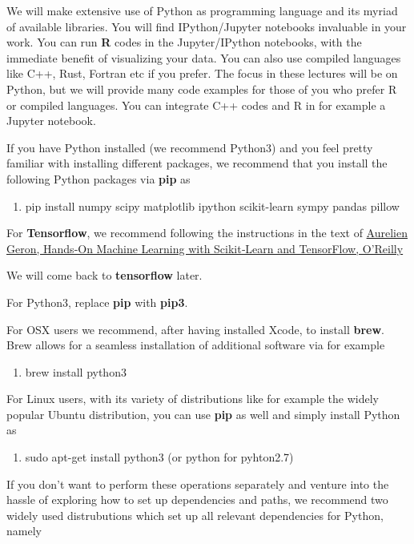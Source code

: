 \documentclass[%
oneside,                 %
final,                   %
10pt]{article}
\begin{document}
\noindent
We will make extensive use of Python as programming language and its
myriad of available libraries.  You will find
IPython/Jupyter notebooks invaluable in your work.  You can run \textbf{R}
codes in the Jupyter/IPython notebooks, with the immediate benefit of
visualizing your data. You can also use compiled languages like C++,
Rust, Fortran etc if you prefer. The focus in these lectures will be
on Python, but we will provide many code examples for those of you who
prefer R or compiled languages. You can integrate C++ codes and R in for example
a Jupyter notebook. 


If you have Python installed (we recommend Python3) and you feel
pretty familiar with installing different packages, we recommend that
you install the following Python packages via \textbf{pip} as 

\begin{enumerate}
\item pip install numpy scipy matplotlib ipython scikit-learn sympy pandas pillow 
\end{enumerate}

\noindent
For \textbf{Tensorflow}, we recommend following the instructions in the text of 
\href{{http://shop.oreilly.com/product/0636920052289.do}}{Aurelien Geron, Hands‑On Machine Learning with Scikit‑Learn and TensorFlow, O'Reilly}

We will come back to \textbf{tensorflow} later. 

For Python3, replace \textbf{pip} with \textbf{pip3}.

For OSX users we recommend, after having installed Xcode, to
install \textbf{brew}. Brew allows for a seamless installation of additional
software via for example 

\begin{enumerate}
\item brew install python3
\end{enumerate}

\noindent
For Linux users, with its variety of distributions like for example the widely popular Ubuntu distribution,
you can use \textbf{pip} as well and simply install Python as 

\begin{enumerate}
\item sudo apt-get install python3  (or python for pyhton2.7)
\end{enumerate}

\noindent
If you don't want to perform these operations separately and venture
into the hassle of exploring how to set up dependencies and paths, we
recommend two widely used distrubutions which set up all relevant
dependencies for Python, namely 
\end{document}
